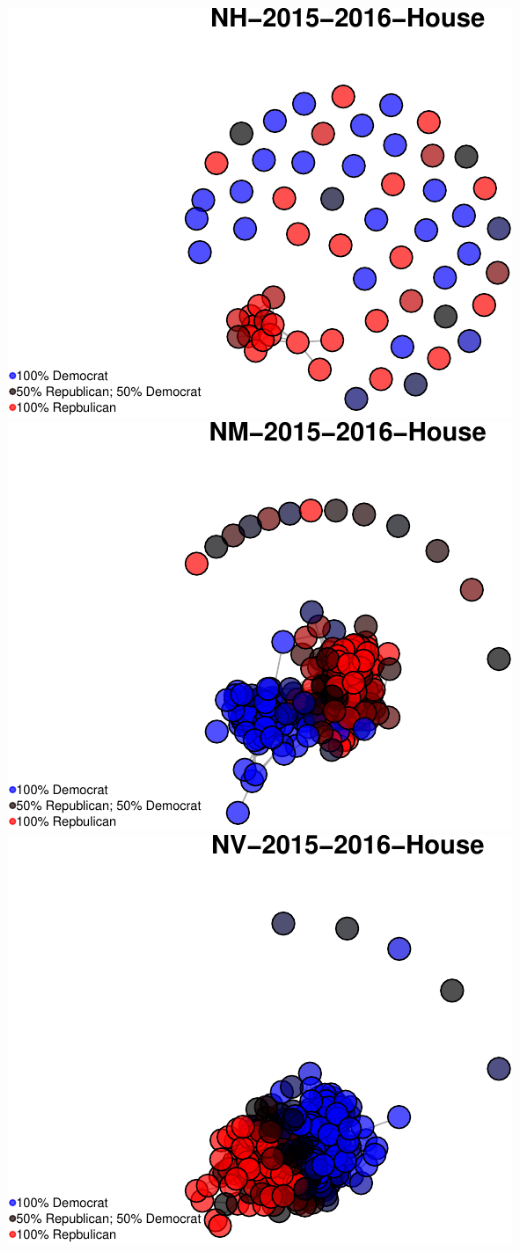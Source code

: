 \documentclass[]{article}
\begin{document}
\includegraphics{Final_Project_RMarkdown_Updated_files/figure-latex/unnamed-chunk-10-25.pdf}
\includegraphics{Final_Project_RMarkdown_Updated_files/figure-latex/unnamed-chunk-10-26.pdf}
\includegraphics{Final_Project_RMarkdown_Updated_files/figure-latex/unnamed-chunk-10-27.pdf}
\end{document}
